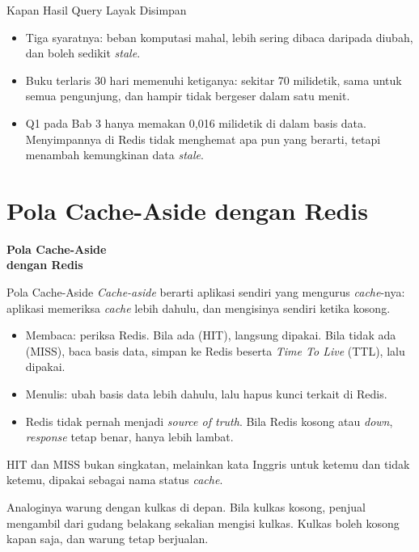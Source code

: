 \documentclass[aspectratio=169, table, 12pt]{beamer}
\begin{document}
\begin{frame}{{\Large Kapan Hasil Query Layak Disimpan}}
  \vspace{10pt}
  \begin{itemize}
    \item Tiga syaratnya: beban komputasi mahal, lebih sering dibaca daripada
          diubah, dan boleh sedikit \textit{stale}.
    \item Buku terlaris 30 hari memenuhi ketiganya: sekitar 70 milidetik, sama
          untuk semua pengunjung, dan hampir tidak bergeser dalam satu menit.
    \item Q1 pada Bab 3 hanya memakan 0,016 milidetik di dalam basis data.
          Menyimpannya di Redis tidak menghemat apa pun yang berarti, tetapi
          menambah kemungkinan data \textit{stale}.
  \end{itemize}
\end{frame}

\section{Pola Cache-Aside dengan Redis}

\begin{frame}{\hfill}
  \centering
  \Huge{\textbf{Pola Cache-Aside\\dengan Redis}}
\end{frame}

\begin{frame}{{\Large Pola Cache-Aside}}
  \vspace{4pt}
  {\footnotesize \textit{Cache-aside} berarti aplikasi sendiri yang mengurus
  \textit{cache}-nya: aplikasi memeriksa \textit{cache} lebih dahulu, dan
  mengisinya sendiri ketika kosong.}
  \vspace{4pt}
  \begin{itemize}
    \item Membaca: periksa Redis. Bila ada (HIT), langsung dipakai. Bila tidak
          ada (MISS), baca basis data, simpan ke Redis beserta \textit{Time To
          Live} (TTL), lalu dipakai.
    \item Menulis: ubah basis data lebih dahulu, lalu hapus kunci terkait di
          Redis.
    \item Redis tidak pernah menjadi \textit{source of truth}. Bila Redis kosong atau
          \textit{down}, \textit{response} tetap benar, hanya lebih lambat.
  \end{itemize}
  \vspace{4pt}
  {\footnotesize HIT dan MISS bukan singkatan, melainkan kata Inggris untuk
  ketemu dan tidak ketemu, dipakai sebagai nama status \textit{cache}.

  \vspace{4pt}
  Analoginya warung dengan kulkas di depan. Bila kulkas kosong, penjual
  mengambil dari gudang belakang sekalian mengisi kulkas. Kulkas boleh kosong
  kapan saja, dan warung tetap berjualan.}
\end{frame}
\end{document}
